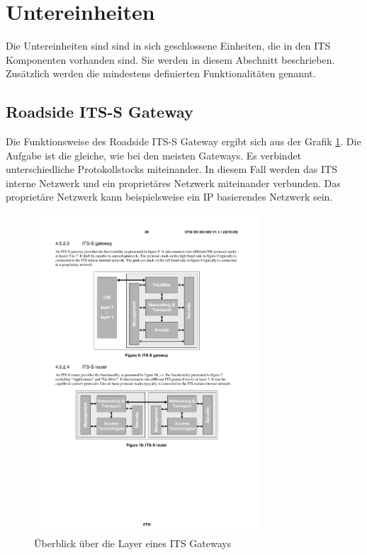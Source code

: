 \section{Untereinheiten}
Die Untereinheiten sind sind in sich geschlossene Einheiten, die in den \ac{ITS} Komponenten vorhanden sind. Sie werden in diesem Abschnitt beschrieben. Zusätzlich werden die mindestens definierten Funktionalitäten genannt.

  
\subsection{Roadside ITS-S Gateway}
Die Funktionsweise des Roadside ITS-S Gateway ergibt sich aus der Grafik \ref{fig:funktionsweise_itsGateway}. Die Aufgabe ist die gleiche, wie bei den meisten Gateways. Es verbindet unterschiedliche Protokollstocks miteinander. In diesem Fall werden das \ac{ITS} interne Netzwerk und ein proprietäres Netzwerk miteinander verbunden. Das proprietäre Netzwerk kann beispielsweise ein IP basierendes Netzwerk sein.

\begin{figure}[h]
\includegraphics[width=0.75\textwidth]{content/images/01_funktionsweise/layer_gateway.pdf}
\caption{Überblick über die Layer eines ITS Gateways \cite{etsi2010302}}
\label{fig:funktionsweise_itsGateway}
\end{figure}

